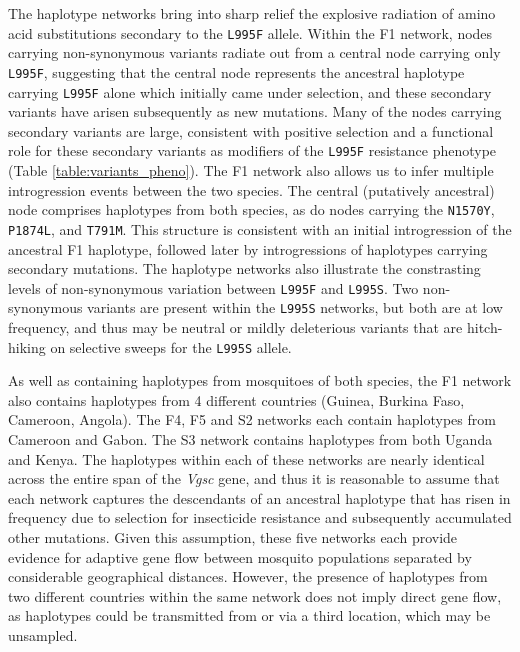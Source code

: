 \documentclass[a4paper,11pt,abstracton,hidelinks]{scrartcl}
\begin{document}
%
The haplotype networks bring into sharp relief the explosive radiation of amino acid substitutions secondary to the \texttt{L995F} allele.
%
Within the F1 network, nodes carrying non-synonymous variants radiate out from a central node carrying only \texttt{L995F}, suggesting that the central node represents the ancestral haplotype carrying \texttt{L995F} alone which initially came under selection, and these secondary variants have arisen subsequently as new mutations.
%
Many of the nodes carrying secondary variants are large, consistent with positive selection and a functional role for these secondary variants as modifiers of the \texttt{L995F} resistance phenotype (Table \ref{table:variants_pheno}).
%
The F1 network also allows us to infer multiple introgression events between the two species.
%
The central (putatively ancestral) node comprises haplotypes from both species, as do nodes carrying the \texttt{N1570Y}, \texttt{P1874L}, and \texttt{T791M}.
%
This structure is consistent with an initial introgression of the ancestral F1 haplotype, followed later by introgressions of haplotypes carrying secondary mutations.
%
The haplotype networks also illustrate the constrasting levels of non-synonymous variation between \texttt{L995F} and \texttt{L995S}. 
%
Two non-synonymous variants are present within the \texttt{L995S} networks, but both are at low frequency, and thus may be neutral or mildly deleterious variants that are hitch-hiking on selective sweeps for the \texttt{L995S} allele.

%
As well as containing haplotypes from mosquitoes of both species, the F1 network also contains haplotypes from 4 different countries (Guinea, Burkina Faso, Cameroon, Angola).
%
The F4, F5 and S2 networks each contain haplotypes from Cameroon and Gabon.
%
The S3 network contains haplotypes from both Uganda and Kenya.
%
The haplotypes within each of these networks are nearly identical across the entire span of the \textit{Vgsc} gene, and thus it is reasonable to assume that each network captures the descendants of an ancestral haplotype that has risen in frequency due to selection for insecticide resistance and subsequently accumulated other mutations.
%
Given this assumption, these five networks each provide evidence for adaptive gene flow between mosquito populations separated by considerable geographical distances.
%
However, the presence of haplotypes from two different countries within the same network does not imply direct gene flow, as haplotypes could be transmitted from or via a third location, which may be unsampled.
%
\end{document}

